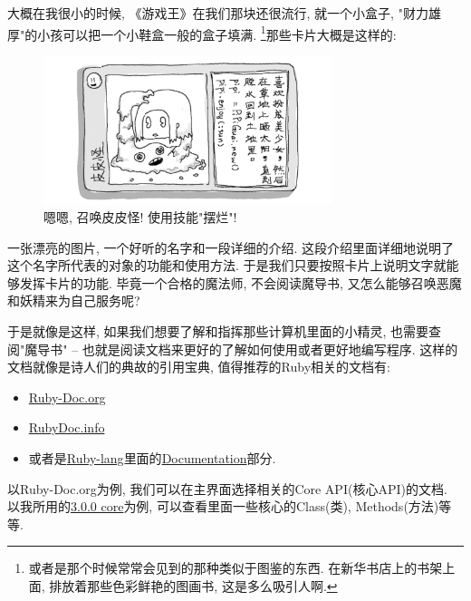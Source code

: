 大概在我很小的时候, 《游戏王》在我们那块还很流行, 就一个小盒子, "财力雄厚"的小孩可以把一个小鞋盒一般的盒子填满. \footnote{或者是那个时候常常会见到的那种类似于图鉴的东西. 在新华书店上的书架上面, 排放着那些色彩鲜艳的图画书, 这是多么吸引人啊. }那些卡片大概是这样的: 

\begin{figure}[h]
  \centering
  \includegraphics[width=0.75\textwidth]{image/chapter/1_language/magic-card.png}
  \caption{嗯嗯, 召唤皮皮怪! 使用技能"摆烂"! }
\end{figure}

一张漂亮的图片, 一个好听的名字和一段详细的介绍. 这段介绍里面详细地说明了这个名字所代表的对象的功能和使用方法. 于是我们只要按照卡片上说明文字就能够发挥卡片的功能. 毕竟一个合格的魔法师, 不会阅读魔导书, 又怎么能够召唤恶魔和妖精来为自己服务呢? 

于是就像是这样, 如果我们想要了解和指挥那些计算机里面的小精灵, 也需要查阅"魔导书" -- 也就是阅读文档来更好的了解如何使用或者更好地编写程序. 这样的文档就像是诗人们的典故的引用宝典, 值得推荐的Ruby相关的文档有: 

\begin{itemize}
  \item \href{https://ruby-doc.org}{Ruby-Doc.org}
  \item \href{https://www.rubydoc.info}{RubyDoc.info}
  \item 或者是\href{https://www.ruby-lang.org}{Ruby-lang}里面的\href{https://www.ruby-lang.org/en/documentation/}{Documentation}部分. 
\end{itemize}

以Ruby-Doc.org为例, 我们可以在主界面选择相关的Core API(核心API)的文档. 以我所用的\href{https://ruby-doc.org/core-3.0.0/}{3.0.0 core}为例, 可以查看里面一些核心的Class(类), Methods(方法)等等. %

